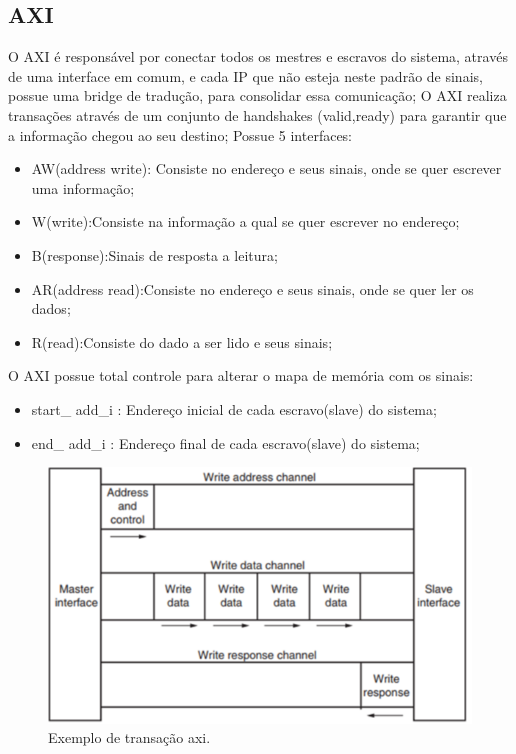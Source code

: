 \subsection{AXI}
O AXI é responsável por conectar todos os mestres e escravos do sistema, através de uma interface em comum, e cada IP que não esteja neste padrão de sinais, possue uma bridge de tradução, para consolidar essa comunicação;
O AXI realiza transações através de um conjunto de handshakes  (valid,ready) para garantir que a informação chegou ao seu destino;
Possue 5 interfaces:

\begin{itemize}
  \item AW(address write): Consiste no endereço e seus sinais, onde se quer escrever uma informação;
  \item W(write):Consiste na informação a qual se quer escrever no endereço;
  \item B(response):Sinais de resposta a leitura;
  \item AR(address read):Consiste no endereço e seus sinais, onde se quer ler os dados;
  \item R(read):Consiste do dado a ser lido e seus sinais;
\end{itemize}
O AXI possue total controle para alterar o mapa de memória com os sinais:
\begin{itemize}
  \item start\_ add\_i : Endereço inicial de cada escravo(slave) do sistema;
  \item end\_ add\_i : Endereço final de cada escravo(slave) do sistema;
\end{itemize}
\begin{figure}[H]
  \includegraphics[width=\linewidth]{diagrams/axi comunication.png}
  \caption{Exemplo de transação axi.}
  \label{fig:top}
\end{figure}
